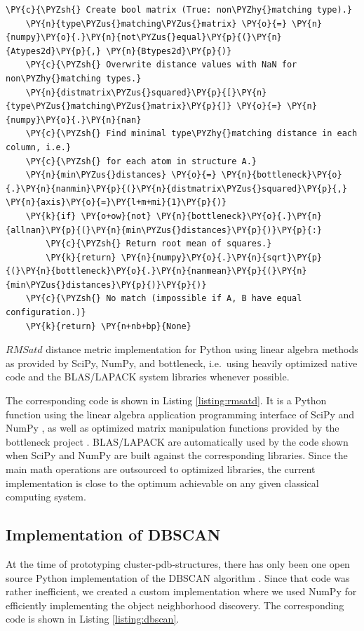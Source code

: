 \begin{listing}
\begin{Verbatim}[fontsize=\tiny,commandchars=\\\{\}]
    \PY{c}{\PYZsh{} Create bool matrix (True: non\PYZhy{}matching type).}
    \PY{n}{type\PYZus{}matching\PYZus{}matrix} \PY{o}{=} \PY{n}{numpy}\PY{o}{.}\PY{n}{not\PYZus{}equal}\PY{p}{(}\PY{n}{Atypes2d}\PY{p}{,} \PY{n}{Btypes2d}\PY{p}{)}
    \PY{c}{\PYZsh{} Overwrite distance values with NaN for non\PYZhy{}matching types.}
    \PY{n}{distmatrix\PYZus{}squared}\PY{p}{[}\PY{n}{type\PYZus{}matching\PYZus{}matrix}\PY{p}{]} \PY{o}{=} \PY{n}{numpy}\PY{o}{.}\PY{n}{nan}
    \PY{c}{\PYZsh{} Find minimal type\PYZhy{}matching distance in each column, i.e.}
    \PY{c}{\PYZsh{} for each atom in structure A.}
    \PY{n}{min\PYZus{}distances} \PY{o}{=} \PY{n}{bottleneck}\PY{o}{.}\PY{n}{nanmin}\PY{p}{(}\PY{n}{distmatrix\PYZus{}squared}\PY{p}{,} \PY{n}{axis}\PY{o}{=}\PY{l+m+mi}{1}\PY{p}{)}
    \PY{k}{if} \PY{o+ow}{not} \PY{n}{bottleneck}\PY{o}{.}\PY{n}{allnan}\PY{p}{(}\PY{n}{min\PYZus{}distances}\PY{p}{)}\PY{p}{:}
        \PY{c}{\PYZsh{} Return root mean of squares.}
        \PY{k}{return} \PY{n}{numpy}\PY{o}{.}\PY{n}{sqrt}\PY{p}{(}\PY{n}{bottleneck}\PY{o}{.}\PY{n}{nanmean}\PY{p}{(}\PY{n}{min\PYZus{}distances}\PY{p}{)}\PY{p}{)}
    \PY{c}{\PYZsh{} No match (impossible if A, B have equal configuration.)}
    \PY{k}{return} \PY{n+nb+bp}{None}
\end{Verbatim}
\caption{$RMSatd$ distance metric implementation for Python using linear algebra
methods as provided by SciPy, NumPy, and bottleneck, i.e.\ using heavily
optimized native code and the BLAS/LAPACK system libraries whenever possible.}
\label{listing:rmsatd}
\end{listing}

The corresponding code is shown in Listing \ref{listing:rmsatd}. It is a Python
function using the linear algebra application programming interface of SciPy and
NumPy \cite{scipy_numpy}, as well as optimized matrix manipulation functions
provided by the bottleneck project \cite{py_bottleneck}. BLAS/LAPACK are
automatically used by the code shown when SciPy and NumPy are built against the
corresponding libraries. Since the main math operations are outsourced to
optimized libraries, the current implementation is close to the optimum
achievable on any given classical computing system.


\subsection{Implementation of DBSCAN}
\label{impl_dbscan}

At the time of prototyping cluster-pdb-structures, there has only been one open
source Python implementation of the DBSCAN algorithm \cite{scikit_learn}. Since
that code was rather inefficient, we created a custom implementation where we
used NumPy \cite{scipy_numpy} for efficiently implementing the object
neighborhood discovery. The corresponding code is shown in Listing
\ref{listing:dbscan}.


